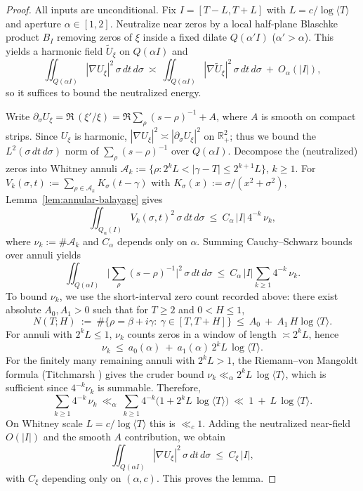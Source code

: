 \documentclass[11pt]{article}
\theoremstyle{definition}
\theoremstyle{remark}
\theoremstyle{definition}
\newcommand{\R}{\mathbb{R}}
\begin{document}
\begin{proof}
All inputs are unconditional. Fix $I=[T-L,T+L]$ with $L=c/\log\langle T\rangle$ and aperture $\alpha\in[1,2]$. Neutralize near zeros by a local half-plane Blaschke product $B_I$ removing zeros of $\xi$ inside a fixed dilate $Q(\alpha'I)$ ($\alpha'>\alpha$). This yields a harmonic field $\widetilde U_\xi$ on $Q(\alpha I)$ and
\[
  \iint_{Q(\alpha I)} |\nabla U_\xi|^2\,\sigma\,dt\,d\sigma\ \asymp\ \iint_{Q(\alpha I)} |\nabla \widetilde U_\xi|^2\,\sigma\,dt\,d\sigma\ +\ O_\alpha(|I|),
\]
so it suffices to bound the neutralized energy.

Write $\partial_\sigma U_\xi=\Re\,(\xi'/\xi)=\Re\sum_\rho (s-\rho)^{-1}+A$, where $A$ is smooth on compact strips. Since $U_\xi$ is harmonic, $|\nabla U_\xi|^2\asymp |\partial_\sigma U_\xi|^2$ on $\R^2_+$; thus we bound the $L^2(\sigma\,dt\,d\sigma)$ norm of $\sum_\rho (s-\rho)^{-1}$ over $Q(\alpha I)$. Decompose the (neutralized) zeros into Whitney annuli $\mathcal A_k:=\{\rho:2^kL<|\gamma-T|\le 2^{k+1}L\}$, $k\ge1$. For $V_k(\sigma,t):=\sum_{\rho\in\mathcal A_k} K_\sigma(t-\gamma)$ with $K_\sigma(x):=\sigma/(x^2+\sigma^2)$, Lemma~\ref{lem:annular-balayage} gives
\[
  \iint_{Q_\alpha(I)} V_k(\sigma,t)^2\,\sigma\,dt\,d\sigma\ \le\ C_\alpha\,|I|\,4^{-k}\,\nu_k,
\]
where $\nu_k:=\#\mathcal A_k$ and $C_\alpha$ depends only on $\alpha$. Summing Cauchy–Schwarz bounds over annuli yields
\[
  \iint_{Q(\alpha I)} \Big|\sum_{\rho}(s-\rho)^{-1}\Big|^2\,\sigma\,dt\,d\sigma\ \le\ C_\alpha\,|I|\sum_{k\ge1}4^{-k}\,\nu_k.
\]
To bound $\nu_k$, we use the short-interval zero count recorded above: there exist absolute $A_0,A_1>0$ such that for $T\ge 2$ and $0<H\le 1$,
\[
  N(T;H)\ :=\ \#\{\rho=\beta+i\gamma:\ \gamma\in[T,T+H]\}\ \le\ A_0\ +\ A_1\,H\log\langle T\rangle.
\]
For annuli with $2^kL\le 1$, $\nu_k$ counts zeros in a window of length $\asymp 2^kL$, hence
\[
  \nu_k\ \le\ a_0(\alpha)\ +\ a_1(\alpha)\,2^kL\,\log\langle T\rangle.
\]
For the finitely many remaining annuli with $2^kL>1$, the Riemann--von Mangoldt formula (Titchmarsh \cite[Thm.~9.3]{Titchmarsh}) gives the cruder bound $\nu_k\ll_\alpha 2^kL\,\log\langle T\rangle$, which is sufficient since $4^{-k}\nu_k$ is summable. Therefore,
\[
  \sum_{k\ge1}4^{-k}\,\nu_k
  \ \ll_\alpha\ 
  \sum_{k\ge1}4^{-k}\Big(1+2^kL\,\log\langle T\rangle\Big)
  \ \ll\ 1\ +\ L\,\log\langle T\rangle.
\]
On Whitney scale $L=c/\log\langle T\rangle$ this is $\ll_c 1$.
Adding the neutralized near-field $O(|I|)$ and the smooth $A$ contribution, we obtain
\[
  \iint_{Q(\alpha I)} |\nabla U_\xi|^2\,\sigma\,dt\,d\sigma\ \le\ C_\xi\,|I|,
\]
with $C_\xi$ depending only on $(\alpha,c)$. This proves the lemma.
\end{proof}
\end{document}
